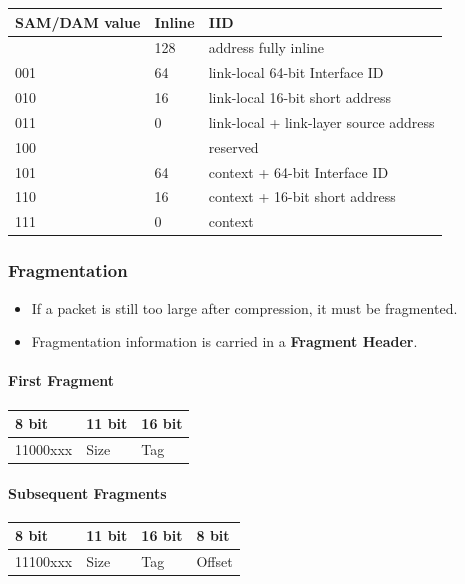 \documentclass[a4paper, 12pt]{book} %
\begin{document}
\begin{longtable}[]{@{}lll@{}}
\toprule\noalign{}
SAM/DAM value & Inline & IID \\
\midrule\noalign{}
\endhead
\bottomrule\noalign{}
\endlastfoot
000 & 128 & address fully inline \\
001 & 64 & link-local 64-bit Interface ID \\
010 & 16 & link-local 16-bit short address \\
011 & 0 & link-local + link-layer source address \\
100 & & reserved \\
101 & 64 & context + 64-bit Interface ID \\
110 & 16 & context + 16-bit short address \\
111 & 0 & context \\
\end{longtable}

\subsubsection{Fragmentation}\label{fragmentation}

\begin{itemize}
\tightlist
\item
  If a packet is still too large after compression, it must be
  fragmented.
\item
  Fragmentation information is carried in a \textbf{Fragment Header}.
\end{itemize}

\paragraph{First Fragment}\label{first-fragment}

\begin{longtable}[]{@{}lll@{}}
\toprule\noalign{}
8 bit & 11 bit & 16 bit \\
\midrule\noalign{}
\endhead
\bottomrule\noalign{}
\endlastfoot
11000xxx & Size & Tag \\
\end{longtable}

\paragraph{Subsequent Fragments}\label{subsequent-fragments}

\begin{longtable}[]{@{}llll@{}}
\toprule\noalign{}
8 bit & 11 bit & 16 bit & 8 bit \\
\midrule\noalign{}
\endhead
\bottomrule\noalign{}
\endlastfoot
11100xxx & Size & Tag & Offset \\
\end{longtable}
\end{document}
